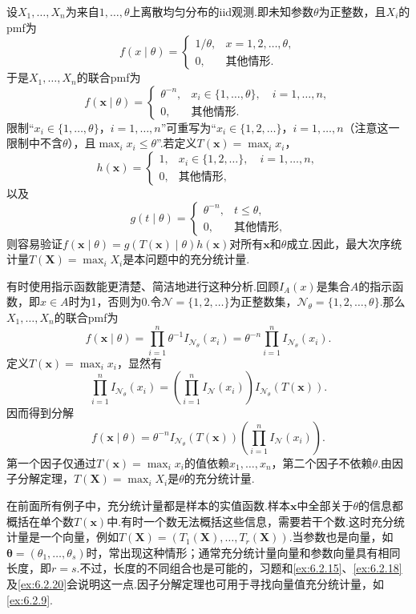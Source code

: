 \begin{example}[均匀分布的充分统计量]\label{ex:6.2.8}
设$X_1,\ldots,X_n$为来自$1,\ldots,\theta$上离散均匀分布的iid观测.即未知参数$\theta$为正整数，且$X_i$的pmf为
$$f(x\mid\theta)=\begin{cases}1/\theta,&x=1,2,\ldots,\theta,\\0,&\text{其他情形}.\end{cases}$$
于是$X_1,\ldots,X_n$的联合pmf为
$$f(\boldsymbol x\mid\theta)=\begin{cases}\theta^{-n},&x_i\in\{1,\ldots,\theta\},\quad i=1,\ldots,n,\\0,&\text{其他情形}.\end{cases}$$
限制“$x_i\in\{1,\ldots,\theta\}$，$i=1,\ldots,n$”可重写为“$x_i\in\{1,2,\ldots\}$，$i=1,\ldots,n$（注意这一限制中不含$\theta$），且$\max_i x_i\le\theta$”.若定义$T(\boldsymbol x)=\max_i x_i$，
$$h(\boldsymbol x)=\begin{cases}1,&x_i\in\{1,2,\ldots\},\quad i=1,\ldots,n,\\0,&\text{其他情形},\end{cases}$$
以及
$$g(t\mid\theta)=\begin{cases}\theta^{-n},&t\le\theta,\\0,&\text{其他情形},\end{cases}$$
则容易验证$f(\boldsymbol x\mid\theta)=g(T(\boldsymbol x)\mid\theta)h(\boldsymbol x)$对所有$\boldsymbol x$和$\theta$成立.因此，最大次序统计量$T(\boldsymbol X)=\max_iX_i$是本问题中的充分统计量.

有时使用指示函数能更清楚、简洁地进行这种分析.回顾$I_A(x)$是集合$A$的指示函数，即$x\in A$时为1，否则为0.令$\mathcal N=\{1,2,\ldots\}$为正整数集，$\mathcal N_\theta=\{1,2,\ldots,\theta\}$.那么$X_1,\ldots,X_n$的联合pmf为
$$f(\boldsymbol x\mid\theta)=\prod_{i=1}^n\theta^{-1}I_{\mathcal N_\theta}(x_i)=\theta^{-n}\prod_{i=1}^n I_{\mathcal N_\theta}(x_i).$$
定义$T(\boldsymbol x)=\max_i x_i$，显然有
$$\prod_{i=1}^n I_{\mathcal N_\theta}(x_i)=\left(\prod_{i=1}^n I_{\mathcal N}(x_i)\right)I_{\mathcal N_\theta}(T(\boldsymbol x)).$$
因而得到分解
$$f(\boldsymbol x\mid\theta)=\theta^{-n}I_{\mathcal N_\theta}(T(\boldsymbol x))\left(\prod_{i=1}^n I_{\mathcal N}(x_i)\right).$$
第一个因子仅通过$T(\boldsymbol x)=\max_i x_i$的值依赖$x_1,\ldots,x_n$，第二个因子不依赖$\theta$.由因子分解定理，$T(\boldsymbol X)=\max_iX_i$是$\theta$的充分统计量.
\end{example}
在前面所有例子中，充分统计量都是样本的实值函数.样本$\boldsymbol x$中全部关于$\theta$的信息都概括在单个数$T(\boldsymbol x)$中.有时一个数无法概括这些信息，需要若干个数.这时充分统计量是一个向量，例如$T(\boldsymbol X)=(T_1(\boldsymbol X),\ldots,T_r(\boldsymbol X))$.当参数也是向量，如$\boldsymbol\theta=(\theta_1,\ldots,\theta_s)$时，常出现这种情形；通常充分统计量向量和参数向量具有相同长度，即$r=s$.不过，长度的不同组合也是可能的，习题和\autoref{ex:6.2.15}、\autoref{ex:6.2.18}及\autoref{ex:6.2.20}会说明这一点.因子分解定理也可用于寻找向量值充分统计量，如\autoref{ex:6.2.9}.
